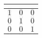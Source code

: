 \begin{table}[!tbp]
\begin{center}
\begin{tabular}{rrr}
\hline\hline
\multicolumn{1}{c}{}&\multicolumn{1}{c}{}&\multicolumn{1}{c}{}\tabularnewline
\hline
$1$&$0$&$0$\tabularnewline
$0$&$1$&$0$\tabularnewline
$0$&$0$&$1$\tabularnewline
\hline
\end{tabular}\end{center}
\end{table}
